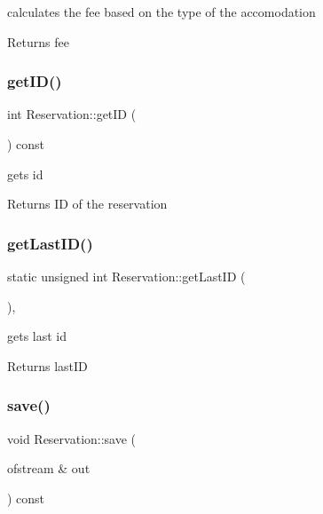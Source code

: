 calculates the fee based on the type of the accomodation 

\begin{DoxyReturn}{Returns}
fee 
\end{DoxyReturn}
\hypertarget{class_reservation_a0d411e0681fc74669776df87fb668983}{}\label{class_reservation_a0d411e0681fc74669776df87fb668983} 
\subsubsection{\texorpdfstring{get\+I\+D()}{getID()}}
{\footnotesize\ttfamily int Reservation\+::get\+ID (\begin{DoxyParamCaption}{ }\end{DoxyParamCaption}) const\hspace{0.3cm}{\ttfamily [inline]}}



gets id 

\begin{DoxyReturn}{Returns}
ID of the reservation 
\end{DoxyReturn}
\hypertarget{class_reservation_ae4d593787bc501a8e4a47ba6b232ff1f}{}\label{class_reservation_ae4d593787bc501a8e4a47ba6b232ff1f} 
\subsubsection{\texorpdfstring{get\+Last\+I\+D()}{getLastID()}}
{\footnotesize\ttfamily static unsigned int Reservation\+::get\+Last\+ID (\begin{DoxyParamCaption}{ }\end{DoxyParamCaption})\hspace{0.3cm}{\ttfamily [inline]}, {\ttfamily [static]}}



gets last id 

\begin{DoxyReturn}{Returns}
last\+ID 
\end{DoxyReturn}
\hypertarget{class_reservation_aaa4ab6143a49aeb8b4cac348bae44ea2}{}\label{class_reservation_aaa4ab6143a49aeb8b4cac348bae44ea2} 
\subsubsection{\texorpdfstring{save()}{save()}}
{\footnotesize\ttfamily void Reservation\+::save (\begin{DoxyParamCaption}\item[{ofstream \&}]{out }\end{DoxyParamCaption}) const}



